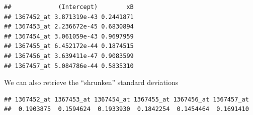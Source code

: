 \documentclass[
]{book}
\newenvironment{Shaded}{\begin{snugshade}}{\end{snugshade}}
\newcommand{\CommentTok}[1]{\textcolor[rgb]{0.56,0.35,0.01}{\textit{#1}}}
\newcommand{\FunctionTok}[1]{\textcolor[rgb]{0.00,0.00,0.00}{#1}}
\newcommand{\NormalTok}[1]{#1}
\newcommand{\SpecialCharTok}[1]{\textcolor[rgb]{0.00,0.00,0.00}{#1}}
\begin{document}
\begin{Shaded}
\end{Shaded}

\begin{verbatim}
##             (Intercept)        xB
## 1367452_at 3.871319e-43 0.2441871
## 1367453_at 2.236672e-45 0.6830894
## 1367454_at 3.061059e-43 0.9697959
## 1367455_at 6.452172e-44 0.1874515
## 1367456_at 3.639411e-47 0.9083599
## 1367457_at 5.084786e-44 0.5835310
\end{verbatim}

We can also retrieve the ``shrunken'' standard deviations

\begin{Shaded}
\end{Shaded}

\begin{verbatim}
## 1367452_at 1367453_at 1367454_at 1367455_at 1367456_at 1367457_at 
##  0.1903875  0.1594624  0.1933930  0.1842254  0.1454464  0.1691410
\end{verbatim}

  
\end{document}
